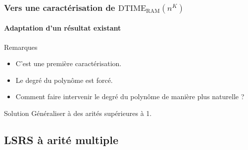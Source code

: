 \documentclass[10pt]{beamer}
\newcommand{\dtimeram}{\text{DTIME}_{\text{RAM}}\left( n^K \right)}
\begin{document}

	
	\begin{frame}
		\frametitle{Vers une caractérisation de $\dtimeram$}
		\framesubtitle{Adaptation d'un résultat existant}
		
		\begin{block}{Remarques}
			\begin{itemize}
				\item 	C'est une première caractérisation.
				\pause 
				\item 	Le degré du polynôme est forcé.
				\pause 
				\item 	Comment faire intervenir le degré du polynôme de manière plus naturelle ?
			\end{itemize}
		\end{block}
		
		\pause 
		
		\begin{block}{Solution}
			Généraliser à des arités supérieures à 1. 
		\end{block}
	\end{frame}
	
	
	
	
	\subsection{LSRS à arité multiple}
	
	
	
\end{document}
